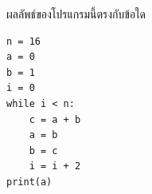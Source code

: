 \question ผลลัพธ์ของโปรแกรมนี้ตรงกับข้อใด
\begin{verbatim}
n = 16
a = 0
b = 1
i = 0
while i < n:
    c = a + b
    a = b
    b = c
    i = i + 2
print(a)
\end{verbatim}
